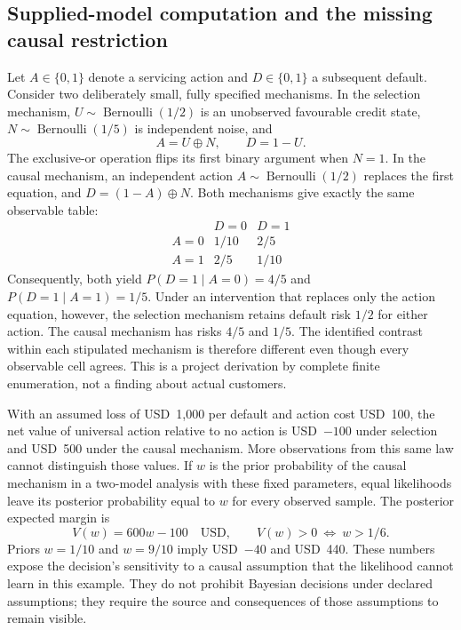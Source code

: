 \subsection{Supplied-model computation and the missing causal restriction}
\label{exec22:state-identification}

Let $A\in\{0,1\}$ denote a servicing action and $D\in\{0,1\}$ a subsequent
default. Consider two deliberately small, fully specified mechanisms. In the
selection mechanism, $U\sim\operatorname{Bernoulli}(1/2)$ is an unobserved
favourable credit state, $N\sim\operatorname{Bernoulli}(1/5)$ is independent noise,
and
\begin{equation}
 A=U\mathbin{\oplus}N,\qquad D=1-U.
 \label{exec22:state-selection}
\end{equation}
The exclusive-or operation flips its first binary argument when $N=1$. In the
causal mechanism, an independent action $A\sim\operatorname{Bernoulli}(1/2)$
replaces the first equation, and $D=(1-A)\mathbin{\oplus}N$. Both mechanisms give
exactly the same observable table:
\begin{equation}
\begin{array}{c|cc}
 &D=0&D=1\\ \hline
A=0&1/10&2/5\\
A=1&2/5&1/10
\end{array}
\label{exec22:state-table}
\end{equation}
Consequently, both yield $P(D=1\mid A=0)=4/5$ and
$P(D=1\mid A=1)=1/5$. Under an intervention that replaces only the action
equation, however, the selection mechanism retains default risk $1/2$ for
either action. The causal mechanism has risks $4/5$ and $1/5$. The identified
contrast within each stipulated mechanism is therefore different even though
every observable cell agrees. This is a project derivation by complete finite
enumeration, not a finding about actual customers.~\citep{exec22_state_reference}

With an assumed loss of USD~1,000 per default and action cost USD~100, the net
value of universal action relative to no action is USD~$-100$ under selection
and USD~500 under the causal mechanism. More observations from this same law
cannot distinguish those values. If $w$ is the prior probability of the causal
mechanism in a two-model analysis with these fixed parameters, equal likelihoods
leave its posterior probability equal to $w$ for every observed sample. The
posterior expected margin is
\begin{equation}
 V(w)=600w-100\quad\text{USD},\qquad V(w)>0\ \Longleftrightarrow\ w>1/6.
 \label{exec22:state-prior}
\end{equation}
Priors $w=1/10$ and $w=9/10$ imply USD~$-40$ and USD~440. These numbers expose
the decision's sensitivity to a causal assumption that the likelihood cannot
learn in this example. They do not prohibit Bayesian decisions under declared
assumptions; they require the source and consequences of those assumptions to
remain visible.

